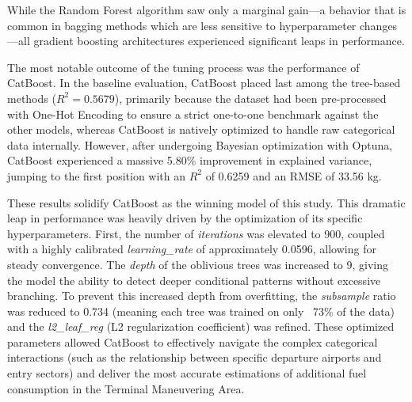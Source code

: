 While the Random Forest algorithm saw only a marginal gain—a behavior that is common in bagging methods which are less sensitive to hyperparameter changes—all gradient boosting architectures experienced significant leaps in performance.

The most notable outcome of the tuning process was the performance of CatBoost. In the baseline evaluation, CatBoost placed last among the tree-based methods ($R^2 = 0.5679$), primarily because the dataset had been pre-processed with One-Hot Encoding to ensure a strict one-to-one benchmark against the other models, whereas CatBoost is natively optimized to handle raw categorical data internally. However, after undergoing Bayesian optimization with Optuna, CatBoost experienced a massive 5.80\% improvement in explained variance, jumping to the first position with an $R^2$ of 0.6259 and an RMSE of 33.56 kg. 

These results solidify CatBoost as the winning model of this study. This dramatic leap in performance was heavily driven by the optimization of its specific hyperparameters. First, the number of \textit{iterations} was elevated to 900, coupled with a highly calibrated \textit{learning\_rate} of approximately 0.0596, allowing for steady convergence. The \textit{depth} of the oblivious trees was increased to 9, giving the model the ability to detect deeper conditional patterns without excessive branching. To prevent this increased depth from overfitting, the \textit{subsample} ratio was reduced to 0.734 (meaning each tree was trained on only ~73\% of the data) and the \textit{l2\_leaf\_reg} (L2 regularization coefficient) was refined. These optimized parameters allowed CatBoost to effectively navigate the complex categorical interactions (such as the relationship between specific departure airports and entry sectors) and deliver the most accurate estimations of additional fuel consumption in the Terminal Maneuvering Area.